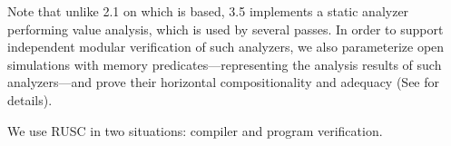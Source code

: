 Note that unlike \cc{} 2.1 on which \ccc{} is based, \cc{} 3.5
implements a static analyzer performing value analysis, which is used by
several passes. In order to support independent modular verification of such analyzers,
we also parameterize open simulations with memory predicates---representing the
analysis results of such analyzers---and
prove their horizontal compositionality and adequacy (See  for details).

 We use RUSC
in two situations: compiler and program verification.

